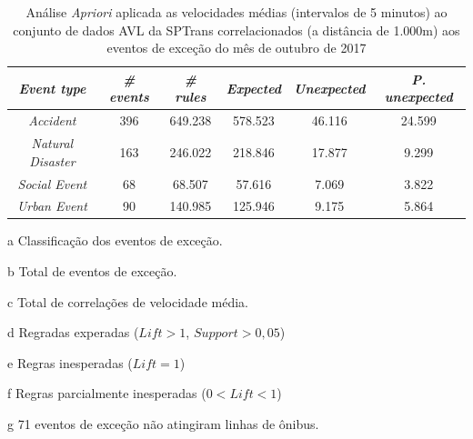 \documentclass[
	12pt,				%
	oneside,			%
	a4paper,			%
	english,			%
	brazil				%
	]{abntex2ppgsi}
\begin{document}
\begin{apendicesenv}
\begin{table}[!htb]
\centering
\begin{threeparttable}
\caption {Análise \textit{Apriori} aplicada as velocidades médias (intervalos de 5 minutos) ao conjunto de dados AVL da SPTrans correlacionados (a distância de 1.000m) aos eventos de exceção do mês de outubro de 2017}
\label {tab:aprioriFull}
\begin{tabular}{c|c|c|c|c|c}
\hline
\textbf{\textit{Event type}}\tnote{a} & \textbf{\textit{\# events}}\tnote{b} & \textit{\textbf{\# rules}}\tnote{c} & \textbf{\textit{Expected}}\tnote{d} & \textbf{\textit{Unexpected}}\tnote{e} & \textbf{\textit{P. unexpected}}\tnote{f}   \\
\hline
\textit{Accident} & 396 & 649.238 & 578.523 & 46.116 & 24.599 \\
\textit{Natural Disaster} & 163 & 246.022 & 218.846 & 17.877 & 9.299 \\
\textit{Social Event} & 68 & 68.507 & 57.616 & 7.069 & 3.822 \\
\textit{Urban Event} & 90 & 140.985 & 125.946 & 9.175 & 5.864 \\
\hline
\end{tabular}
\begin{tablenotes}
            \item[a] Classificação dos eventos de exceção.
            \item[b] Total de eventos de exceção.
            \item[c] Total de correlações de velocidade média.
            \item[d] Regradas experadas ($Lift > 1$, $Support > 0,05$)
            \item[e] Regras inesperadas ($Lift = 1$)
            \item[f] Regras parcialmente inesperadas ($0 < Lift < 1$)
            \item[g] 71 eventos de exceção não atingiram linhas de ônibus.
        \end{tablenotes}
\end{threeparttable}
\end{table}


\end{apendicesenv}
\end{document}
